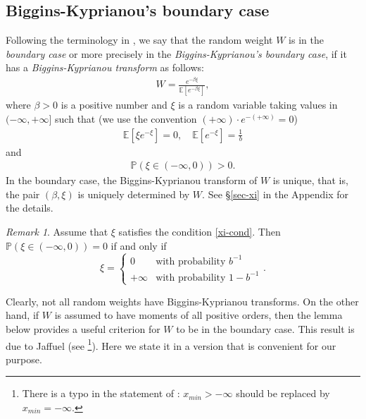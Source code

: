 \documentclass[12pt]{amsart}
\theoremstyle{definition}
\theoremstyle{remark}
\newtheorem*{remark*}{Remark}
\newcommand{\E}{\mathbb{E}}
\newcommand{\PP}{\mathbb{P}}
\numberwithin{equation}{section}
\begin{document}
\subsection{Biggins-Kyprianou's boundary case}\label{sec-BK-transformation}
Following the terminology in  \cite{Bigins-EJP}, 
 we say that  the random weight $W$  is in the  {\it  boundary case} or more precisely  in the {\it Biggins-Kyprianou's boundary case},  if it has a {\it Biggins-Kyprianou transform} as follows:
\begin{align}\label{bdary-reg}
W= \frac{e^{-\beta \xi}}{\E[e^{-\beta\xi}]},
\end{align}
where $\beta>0$ is a positive number and $\xi$ is a random variable  taking values in $(-\infty, +\infty]$ such that (we use the convention $(+\infty)\cdot e^{-(+\infty)} = 0$)
\begin{align}\label{xi-cond}
\E[\xi e^{-\xi}] = 0, \quad \E[e^{-\xi}] = \frac{1}{b}
\end{align}
and 
\begin{align}\label{xi-cond-bis}
\PP(\xi\in (-\infty, 0))> 0. 
\end{align}
In the boundary case,  the Biggins-Kyprianou transform of $W$ is unique, that is,  the pair $(\beta, \xi)$ is uniquely determined by $W$. See  \S \ref{sec-xi} in the Appendix for the details.





\begin{remark*}
Assume that  $\xi$ satisfies the condition \eqref{xi-cond}. Then $\PP(\xi\in (-\infty, 0)) = 0$ if and only if  
\[
\xi = \left\{
\begin{array}{cl}
 0 & \text{with probability $b^{-1}$}
\\
 +\infty &  \text{with probability $1-b^{-1}$}
\end{array}
\right..
\]
\end{remark*}


 



Clearly, not all random weights have Biggins-Kyprianou transforms. On the other hand, if $W$ is assumed to have moments of all positive  orders, then the lemma below provides a useful criterion for $W$ to be in the boundary case.  This result is  due to Jaffuel (see \cite[the ArXiv version, Proposition A.2]{Jaffuel}\footnote{There is a typo in the statement of \cite[the ArXiv version, Proposition A.2]{Jaffuel}: $x_{min}>-\infty$ should be replaced by $x_{min} = -\infty$.}). Here  we state it in a version that is convenient for our purpose. 
\end{document}
